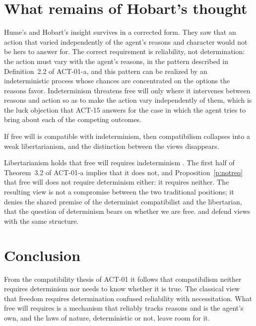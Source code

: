 \documentclass{situationist-preprint}
\begin{document}
\section{What remains of Hobart's thought}

Hume's and Hobart's insight survives in a corrected form. They saw that an action that varied independently of the agent's reasons and character would not be hers to answer for. The correct requirement is reliability, not determination: the action must vary with the agent's reasons, in the pattern described in Definition~2.2 of ACT-01-a, and this pattern can be realized by an indeterministic process whose chances are concentrated on the options the reasons favor. Indeterminism threatens free will only where it intervenes between reasons and action so as to make the action vary independently of them, which is the luck objection that ACT-15 answers for the case in which the agent tries to bring about each of the competing outcomes.

\begin{objection}
If free will is compatible with indeterminism, then compatibilism collapses into a weak libertarianism, and the distinction between the views disappears.
\end{objection}

\begin{reply}
Libertarianism holds that free will requires indeterminism \citep{Kane1996}. The first half of Theorem~3.2 of ACT-01-a implies that it does not, and Proposition~\ref{p:notreq} that free will does not require determinism either: it requires neither. The resulting view is not a compromise between the two traditional positions; it denies the shared premise of the determinist compatibilist and the libertarian, that the question of determinism bears on whether we are free. \citet{List2019} and \citet{Vihvelin2013} defend views with the same structure.
\end{reply}

\section{Conclusion}

From the compatibility thesis of ACT-01 it follows that compatibilism neither requires determinism nor needs to know whether it is true. The classical view that freedom requires determination confused reliability with necessitation. What free will requires is a mechanism that reliably tracks reasons and is the agent's own, and the laws of nature, deterministic or not, leave room for it.
\end{document}
